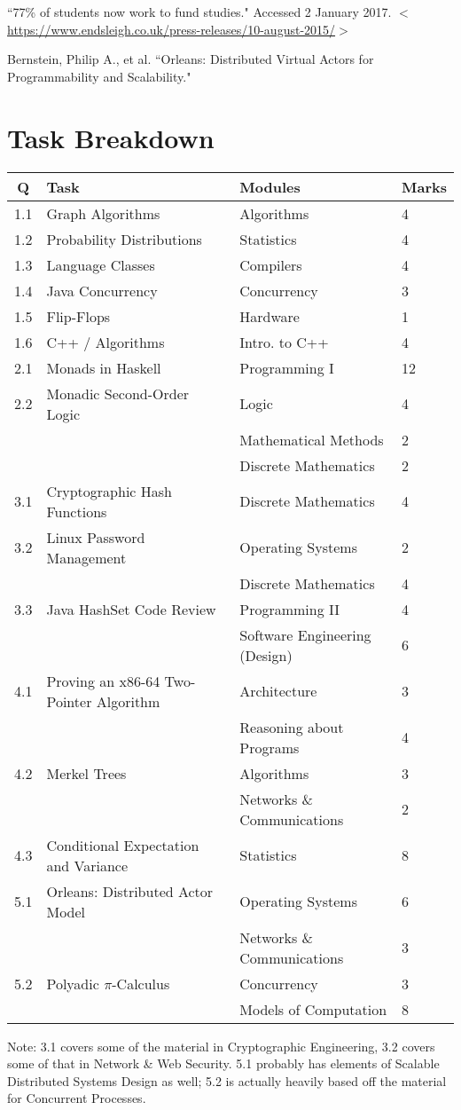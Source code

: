 \documentclass[12pt, a4paper]{article}
\begin{document}
\newpage
\begin{thebibliography}{9}
``77\% of students now work to fund studies." Accessed 2 January 2017. $<$\url{https://www.endsleigh.co.uk/press-releases/10-august-2015/}$>$

Bernstein, Philip A., et al. ``Orleans: Distributed Virtual Actors for Programmability and Scalability."
\end{thebibliography}

\newpage

\section*{Task Breakdown}
\begin{center}
\begin{tabular}{c|l|l|l}
Q & Task & Modules & Marks \\ \hline
1.1 & Graph Algorithms & Algorithms & 4 \\
1.2 & Probability Distributions & Statistics & 4 \\
1.3 & Language Classes & Compilers & 4 \\
1.4 & Java Concurrency & Concurrency & 3 \\
1.5 & Flip-Flops & Hardware & 1 \\
1.6 & C++ / Algorithms & Intro. to C++ & 4 \\ \hline
2.1 & Monads in Haskell & Programming I & 12 \\
2.2 & Monadic Second-Order Logic & Logic & 4 \\
& & Mathematical Methods & 2 \\
& & Discrete Mathematics & 2 \\ \hline
3.1 & Cryptographic Hash Functions & Discrete Mathematics & 4 \\
3.2 & Linux Password Management & Operating Systems & 2 \\
& & Discrete Mathematics & 4 \\
3.3 & Java HashSet Code Review & Programming II & 4 \\
& & Software Engineering (Design) & 6 \\ \hline
4.1 & Proving an x86-64 Two-Pointer Algorithm & Architecture & 3 \\
& & Reasoning about Programs & 4 \\
4.2 & Merkel Trees & Algorithms & 3 \\
& & Networks \& Communications & 2 \\
4.3 & Conditional Expectation and Variance & Statistics & 8 \\ \hline
5.1 & Orleans: Distributed Actor Model & Operating Systems & 6 \\
& & Networks \& Communications & 3 \\
5.2 & Polyadic $\pi$-Calculus & Concurrency & 3 \\
& & Models of Computation & 8
\end{tabular}
\end{center}

\noindent Note: 3.1 covers some of the material in Cryptographic Engineering, 3.2 
covers some of that in Network \& Web Security. 5.1 probably has elements of 
Scalable  Distributed Systems Design as well; 5.2 is actually heavily based off the 
material for Concurrent Processes.
\end{document}
